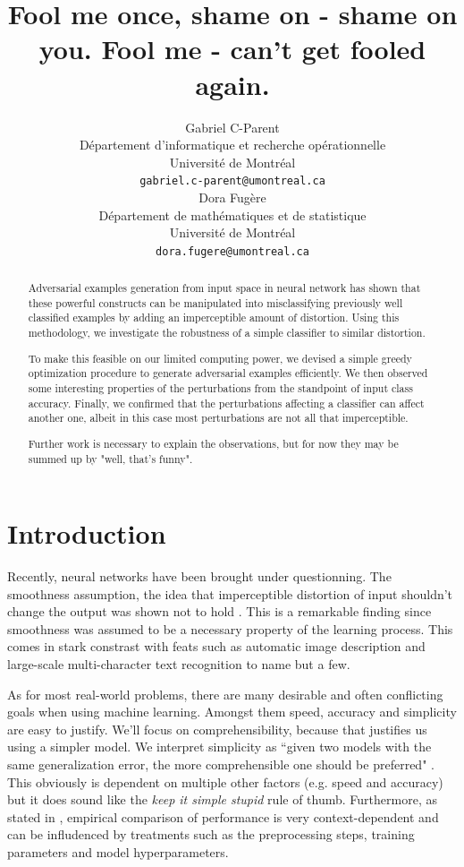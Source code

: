 \documentclass{article} %
\author{
Gabriel C-Parent\\
Département d’informatique et recherche opérationnelle\\
Université de Montréal\\
\texttt{gabriel.c-parent@umontreal.ca} \\
\And
Dora Fugère \\
Département de mathématiques et de statistique \\
Université de Montréal\\
\texttt{dora.fugere@umontreal.ca} \\
}
\begin{document}
\title{Fool me once, shame on - shame on you. \newline
       Fool me - can't get fooled again.}
      
\maketitle

\begin{abstract}
Adversarial examples generation from input space in neural network
has shown that these powerful constructs can be manipulated into misclassifying previously well classified examples by adding an imperceptible
amount of distortion. Using this methodology, we investigate the robustness of a
simple classifier to similar distortion.

To make this feasible on our limited computing power, we devised a simple greedy optimization procedure to generate adversarial examples efficiently.
We then observed some interesting properties of the perturbations from the standpoint of input class accuracy.
Finally, we confirmed that the perturbations affecting a classifier can affect another one, albeit in this case most perturbations are not all that imperceptible.

Further work is necessary to explain the observations, but for now they may be summed up by "well, that's funny".
\end{abstract}


\section{Introduction}

Recently, neural networks have been brought under questionning. The smoothness
assumption, the idea that imperceptible distortion of input shouldn't change
the output was shown not to hold \citep{szegedy_intriguing_2013}. This is a
remarkable finding since smoothness was assumed to be a necessary property of the
learning process.
This comes in stark constrast with feats such as automatic image description
\citep{vinyals_show_2014} and large-scale multi-character text recognition
\citep{goodfellow_multi-digit_2013} to name but a few.

As for most real-world problems, there are many desirable and often conflicting
goals when using machine learning. Amongst them speed, accuracy and simplicity
are easy to justify. We'll focus on comprehensibility, because that justifies
us using a simpler model.
We interpret simplicity as ``given two models with the same generalization error, the more
comprehensible one should be preferred" \citep{domingos_role_1999}.
This obviously is dependent on multiple other factors (e.g. speed and accuracy)
but it does sound like the \textit{keep it simple stupid} rule of thumb.
Furthermore, as stated in \citep{hand_classifier_2006}, empirical comparison of
performance is very context-dependent and can be infludenced by treatments such 
as the preprocessing steps, training parameters and model hyperparameters.
\end{document}
